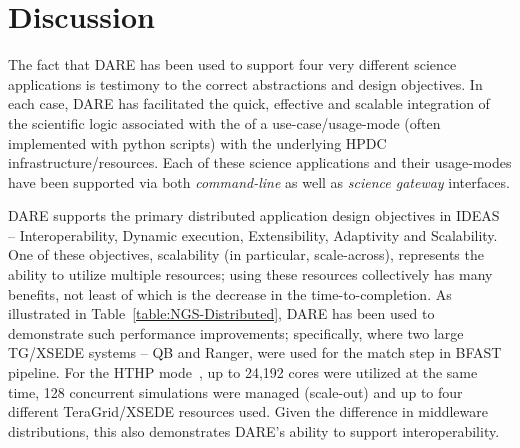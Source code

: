 \documentclass[]{svjour3}
\begin{document}
% 
\section{Discussion}

The fact that DARE has been used to support four very different
science applications is testimony to the correct abstractions and
design objectives. In each case, DARE has facilitated the quick,
effective and scalable integration of the scientific logic associated
with the of a use-case/usage-mode (often implemented with python
scripts) with the underlying HPDC infrastructure/resources. Each of
these science applications and their usage-modes have been supported
via both {\it command-line} as well as {\it science gateway}
interfaces.

DARE supports the primary distributed application design objectives in
IDEAS~\cite{ideas} -- Interoperability, Dynamic execution,
Extensibility, Adaptivity and Scalability. One of these objectives,
scalability (in particular, scale-across), represents the ability to
utilize multiple resources; using these resources collectively has
many benefits, not least of which is the decrease in the
time-to-completion. As illustrated in
Table~\ref{table:NGS-Distributed}, DARE has been used to demonstrate
such performance improvements; specifically, where two large TG/XSEDE
systems -- QB and Ranger, were used for the match step in BFAST
pipeline. For the HTHP mode~\cite{xsede12_ensemble}, up to 24,192 cores
were utilized at the same time, 128 concurrent simulations were
managed (scale-out) and up to four different TeraGrid/XSEDE resources
used. Given the difference in middleware distributions, this also
demonstrates DARE's ability to support interoperability.
\end{document}
